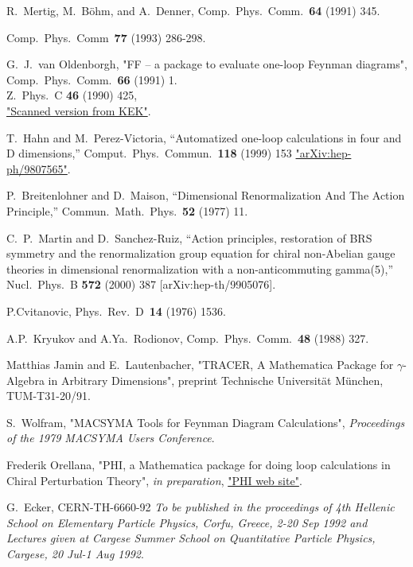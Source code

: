 \begin{thebibliography}{99}
 R.~Mertig, M.~B\"ohm, and A.~Denner,
Comp.~Phys.~Comm.~{\bf 64} (1991) 345. 

Comp.~Phys.~Comm~{\bf 77} (1993) 286-298.

G.~J.~van Oldenborgh, "FF -- a package to evaluate one-loop Feynman diagrams",
Comp.~Phys.~Comm.~{\bf 66} (1991) 1.\\
Z.\ Phys.\ C {\bf 46} (1990) 425,\\
\href{http://ccdb3fs.kek.jp/cgi-bin/img_index?9004168}{"Scanned version from KEK"}.

T.~Hahn and M.~Perez-Victoria,
``Automatized one-loop calculations in four and D dimensions,''
Comput.\ Phys.\ Commun.\  {\bf 118} (1999) 153
\href{http://xxx.lanl.gov/abs/hep-ph/9807565}{"arXiv:hep-ph/9807565"}.

P.~Breitenlohner and D.~Maison,
``Dimensional Renormalization And The Action Principle,''
Commun.\ Math.\ Phys.\  {\bf 52} (1977) 11.

C.~P.~Martin and D.~Sanchez-Ruiz,
``Action principles, restoration of BRS symmetry and the renormalization  group equation for chiral non-Abelian gauge theories in dimensional
renormalization with a non-anticommuting gamma(5),''
Nucl.\ Phys.\ B {\bf 572} (2000) 387
[arXiv:hep-th/9905076].

P.Cvitanovic, Phys.~Rev.~D~{\bf 14} (1976) 1536.

A.P.~Kryukov and A.Ya.~Rodionov, Comp.~Phys.~Comm.~{\bf 48} (1988) 
327.

Matthias Jamin and E.~Lautenbacher, 
"TRACER, A Mathematica Package for $\gamma$-Algebra in Arbitrary Dimensions",
preprint Technische Universit\"at M\"unchen, TUM-T31-20/91.

 S.~Wolfram, "MACSYMA Tools for Feynman Diagram Calculations",
{\sl Proceedings of the 1979 MACSYMA Users Conference}.

 Frederik Orellana, "PHI, a Mathematica package for doing loop calculations in Chiral Perturbation Theory", {\it in preparation}, \href{http://www.feyncalc.org/phi/}{"PHI web site"}.

G.~Ecker,
CERN-TH-6660-92
{\it To be published in the proceedings of 4th Hellenic School on Elementary Particle Physics, Corfu, Greece, 2-20 Sep 1992 and Lectures given at
Cargese Summer School on Quantitative Particle Physics, Cargese, 20 Jul-1 Aug 1992}.


\end{thebibliography}
